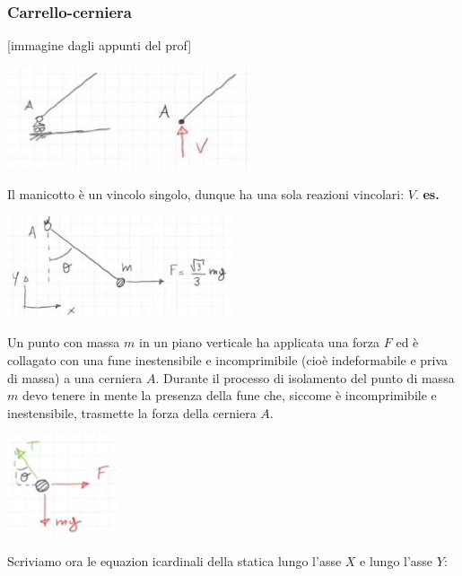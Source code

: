 \subsubsection{Carrello-cerniera}
[immagine dagli appunti del prof]
\begin{center}
    \includegraphics[height=3cm]{../lezione6/img6.JPG}
\end{center}
Il manicotto è un vincolo singolo, dunque ha una sola reazioni vincolari: $V$.
\newline
\newline
\textbf{es.} 
\begin{center}
    \includegraphics[height=3cm]{../lezione6/img7.JPG}
\end{center}
Un punto con massa $m$ in un piano verticale ha applicata una forza $F$ ed è collagato con una fune inestensibile e incomprimibile (cioè indeformabile e priva di massa) a una cerniera $A$.\newline
\newline
Durante il processo di isolamento del punto di massa $m$ devo tenere in mente la presenza della fune che, siccome è incomprimibile e inestensibile, trasmette la forza della cerniera $A$.
\begin{center}
    \includegraphics[height=3cm]{../lezione6/img8.JPG}
\end{center}
Scriviamo ora le equazion icardinali della statica lungo l'asse $X$ e lungo l'asse $Y$:
